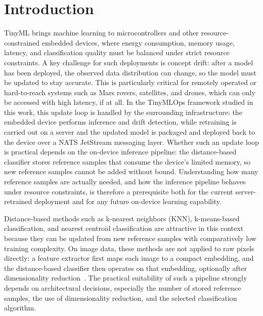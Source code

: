 \documentclass[sigconf,review,nonacm]{acmart}
\begin{document}

\maketitle

\section{Introduction}
TinyML brings machine learning to microcontrollers and other resource-constrained embedded devices, where energy consumption, memory usage, latency, and classification quality must be balanced under strict resource constraints.
A key challenge for such deployments is concept drift: after a model has been deployed, the observed data distribution can change, so the model must be updated to stay accurate.
This is particularly critical for remotely operated or hard-to-reach systems such as Mars rovers, satellites, and drones, which can only be accessed with high latency, if at all.
In the TinyMLOps framework studied in this work, this update loop is handled by the surrounding infrastructure: the embedded device performs inference and drift detection, while retraining is carried out on a server and the updated model is packaged and deployed back to the device over a NATS JetStream messaging layer.
Whether such an update loop is practical depends on the on-device inference pipeline: the distance-based classifier stores reference samples that consume the device's limited memory, so new reference samples cannot be added without bound.
Understanding how many reference samples are actually needed, and how the inference pipeline behaves under resource constraints, is therefore a prerequisite both for the current server-retrained deployment and for any future on-device learning capability.

Distance-based methods such as k-nearest neighbors (KNN), k-means-based classification, and nearest centroid classification are attractive in this context because they can be updated from new reference samples with comparatively low training complexity.
On image data, these methods are not applied to raw pixels directly: a feature extractor first maps each image to a compact embedding, and the distance-based classifier then operates on that embedding, optionally after dimensionality reduction~\cite{disabato2020incremental}.
The practical suitability of such a pipeline strongly depends on architectural decisions, especially the number of stored reference samples, the use of dimensionality reduction, and the selected classification algorithm.
\end{document}
